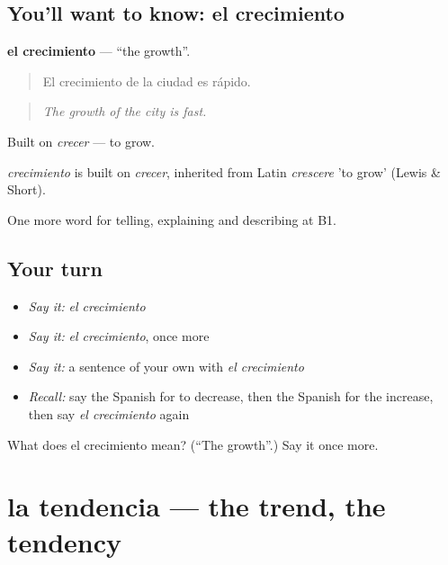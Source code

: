 \subsection*{You'll want to know: el crecimiento}
\textbf{el crecimiento} — \textquotedblleft{}the growth\textquotedblright{}.

\begin{quote}
El crecimiento de la ciudad es rápido.
\end{quote}

\begin{quote}
\emph{The growth of the city is fast.}
\end{quote}

Built on \emph{crecer} — to grow.

\begin{cousinweb}
\emph{crecimiento} is built on \emph{crecer}, inherited from Latin \emph{crescere} 'to grow' (Lewis \& Short).
\end{cousinweb}

\begin{grammarlens}[title={What you've built}]
One more word for telling, explaining and describing at B1.
\end{grammarlens}

\subsection*{Your turn}
\begin{itemize}
\raggedright
  \item \emph{Say it:} \emph{el crecimiento}
  \item \emph{Say it:} \emph{el crecimiento}, once more
  \item \emph{Say it:} a sentence of your own with \emph{el crecimiento}
  \item \emph{Recall:} say the Spanish for to decrease, then the Spanish for the increase, then say \emph{el crecimiento} again
\end{itemize}

\begin{tcolorbox}[breakable,colback=teal!4,colframe=teal!35!black,title={Before you move on}]
What does el crecimiento mean? (\textquotedblleft{}The growth\textquotedblright{}.) Say it once more.
\end{tcolorbox}
\section[la tendencia]{la tendencia — the trend, the tendency}

